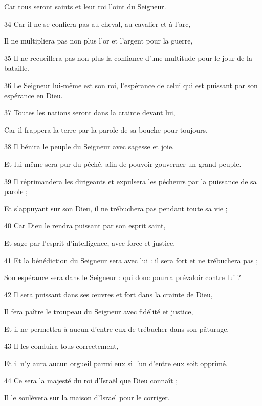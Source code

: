 \par     Car tous seront saints et leur roi l'oint du Seigneur.
\par 34 Car il ne se confiera pas au cheval, au cavalier et à l'arc,
\par     Il ne multipliera pas non plus l'or et l'argent pour la guerre,
\par   
\par 35 Il ne recueillera pas non plus la confiance d'une multitude pour le jour de la bataille.
\par 36 Le Seigneur lui-même est son roi, l'espérance de celui qui est puissant par son espérance en Dieu.
\par   
\par 37 Toutes les nations seront dans la crainte devant lui,
\par     Car il frappera la terre par la parole de sa bouche pour toujours.
\par 38 Il bénira le peuple du Seigneur avec sagesse et joie,
\par     Et lui-même sera pur du péché, afin de pouvoir gouverner un grand peuple.
\par 39 Il réprimandera les dirigeants et expulsera les pécheurs par la puissance de sa parole ;
\par     Et s'appuyant sur son Dieu, il ne trébuchera pas pendant toute sa vie ;
\par 40 Car Dieu le rendra puissant par son esprit saint,
\par     Et sage par l'esprit d'intelligence, avec force et justice.
\par 41 Et la bénédiction du Seigneur sera avec lui : il sera fort et ne trébuchera pas ;
\par     Son espérance sera dans le Seigneur : qui donc pourra prévaloir contre lui ?
\par 42 Il sera puissant dans ses œuvres et fort dans la crainte de Dieu,
\par     Il fera paître le troupeau du Seigneur avec fidélité et justice,
\par     Et il ne permettra à aucun d'entre eux de trébucher dans son pâturage.
\par 43 Il les conduira tous correctement,
\par     Et il n’y aura aucun orgueil parmi eux si l’un d’entre eux soit opprimé.
\par 44 Ce sera la majesté du roi d'Israël que Dieu connaît ;
\par     Il le soulèvera sur la maison d'Israël pour le corriger.
